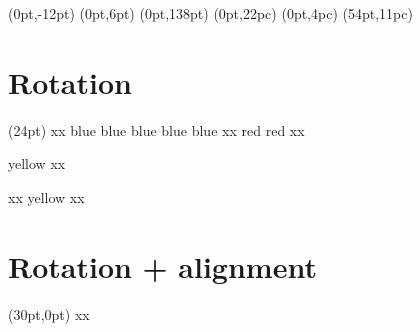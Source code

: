 \documentclass{article}
\newcommand\cbox[2][.8]{{\setlength\fboxsep{0pt}\colorbox[gray]{#1}{#2}}}
\begin{document}
\aligncoffins   \ccc [H,r] \ddd [H,r](0pt,-12pt)
\aligncoffins   \ccc [t,l] \bbb      (0pt,6pt)
\aligncoffins   \ccc [H,r] \aaa [H,r](0pt,138pt)
\aligncoffins   \eee [T,l] \ccc      (0pt,22pc)
\aligncoffins   \fff       \eee [B,l](0pt,4pc)
\aligncoffins   \ggg [b,l] \fff [B,l](54pt,11pc)


\vspace*{-2cm}
\noindent\cbox{\usebox\ggg}


\newpage

\section{Rotation}

\sbox {}
\sbox {}

\adjustcoffinpole {}(24pt)
\displaycoffinpoles {}
x\cbox{\usebox \aaa }x
%
\rotatecoffin {}
\displaycoffinhandle {} {blue}
\displaycoffinhandle {} {blue}
\displaycoffinhandle {} {blue}
\displaycoffinhandle {} {blue}
\displaycoffinhandle {} {blue}
\quad
x\cbox{\usebox \aaa }x
\rotatecoffin {}
\displaycoffinhandle {} {red}
\displaycoffinhandle {} {red}
\quad
x\cbox{\usebox \aaa }x

\vspace{1cm}

\rotatecoffin {}
\displaycoffinhandle {} {yellow}
%
x\cbox{\usebox \aaa }x
%

\vspace{1cm}

x\cbox{\usebox \bbb }x
%
\rotatecoffin {}
\displaycoffinhandle {} {yellow}
\quad
x\cbox{\usebox \bbb }x


\section{Rotation + alignment}

\aligncoffins \aaa [b,l] \bbb[B,hc](30pt,0pt)
x\cbox{\usebox \aaa }x
\end{document}
